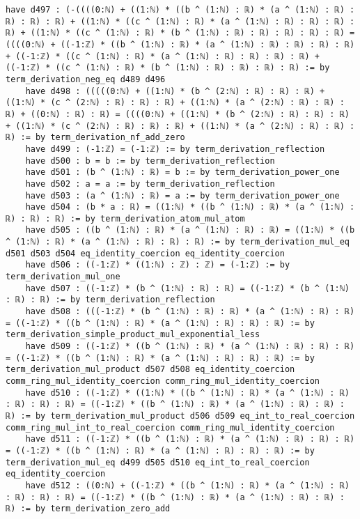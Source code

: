 \documentclass{article}
\begin{document}
\begin{tcolorbox}[colback=white!10, width=\linewidth]
\begin{lstlisting}[language=Lean4]
    have d497 : (-((((0:ℕ) + ((1:ℕ) * ((b ^ (1:ℕ) : ℝ) * (a ^ (1:ℕ) : ℝ) : ℝ) : ℝ) : ℝ) + ((1:ℕ) * ((c ^ (1:ℕ) : ℝ) * (a ^ (1:ℕ) : ℝ) : ℝ) : ℝ) : ℝ) + ((1:ℕ) * ((c ^ (1:ℕ) : ℝ) * (b ^ (1:ℕ) : ℝ) : ℝ) : ℝ) : ℝ) : ℝ) = ((((0:ℕ) + ((-1:ℤ) * ((b ^ (1:ℕ) : ℝ) * (a ^ (1:ℕ) : ℝ) : ℝ) : ℝ) : ℝ) + ((-1:ℤ) * ((c ^ (1:ℕ) : ℝ) * (a ^ (1:ℕ) : ℝ) : ℝ) : ℝ) : ℝ) + ((-1:ℤ) * ((c ^ (1:ℕ) : ℝ) * (b ^ (1:ℕ) : ℝ) : ℝ) : ℝ) : ℝ) := by term_derivation_neg_eq d489 d496
    have d498 : (((((0:ℕ) + ((1:ℕ) * (b ^ (2:ℕ) : ℝ) : ℝ) : ℝ) + ((1:ℕ) * (c ^ (2:ℕ) : ℝ) : ℝ) : ℝ) + ((1:ℕ) * (a ^ (2:ℕ) : ℝ) : ℝ) : ℝ) + ((0:ℕ) : ℝ) : ℝ) = ((((0:ℕ) + ((1:ℕ) * (b ^ (2:ℕ) : ℝ) : ℝ) : ℝ) + ((1:ℕ) * (c ^ (2:ℕ) : ℝ) : ℝ) : ℝ) + ((1:ℕ) * (a ^ (2:ℕ) : ℝ) : ℝ) : ℝ) := by term_derivation_nf_add_zero
    have d499 : (-1:ℤ) = (-1:ℤ) := by term_derivation_reflection
    have d500 : b = b := by term_derivation_reflection
    have d501 : (b ^ (1:ℕ) : ℝ) = b := by term_derivation_power_one
    have d502 : a = a := by term_derivation_reflection
    have d503 : (a ^ (1:ℕ) : ℝ) = a := by term_derivation_power_one
    have d504 : (b * a : ℝ) = ((1:ℕ) * ((b ^ (1:ℕ) : ℝ) * (a ^ (1:ℕ) : ℝ) : ℝ) : ℝ) := by term_derivation_atom_mul_atom
    have d505 : ((b ^ (1:ℕ) : ℝ) * (a ^ (1:ℕ) : ℝ) : ℝ) = ((1:ℕ) * ((b ^ (1:ℕ) : ℝ) * (a ^ (1:ℕ) : ℝ) : ℝ) : ℝ) := by term_derivation_mul_eq d501 d503 d504 eq_identity_coercion eq_identity_coercion
    have d506 : ((-1:ℤ) * ((1:ℕ) : ℤ) : ℤ) = (-1:ℤ) := by term_derivation_mul_one
    have d507 : ((-1:ℤ) * (b ^ (1:ℕ) : ℝ) : ℝ) = ((-1:ℤ) * (b ^ (1:ℕ) : ℝ) : ℝ) := by term_derivation_reflection
    have d508 : (((-1:ℤ) * (b ^ (1:ℕ) : ℝ) : ℝ) * (a ^ (1:ℕ) : ℝ) : ℝ) = ((-1:ℤ) * ((b ^ (1:ℕ) : ℝ) * (a ^ (1:ℕ) : ℝ) : ℝ) : ℝ) := by term_derivation_simple_product_mul_exponential_less
    have d509 : ((-1:ℤ) * ((b ^ (1:ℕ) : ℝ) * (a ^ (1:ℕ) : ℝ) : ℝ) : ℝ) = ((-1:ℤ) * ((b ^ (1:ℕ) : ℝ) * (a ^ (1:ℕ) : ℝ) : ℝ) : ℝ) := by term_derivation_mul_product d507 d508 eq_identity_coercion comm_ring_mul_identity_coercion comm_ring_mul_identity_coercion
    have d510 : ((-1:ℤ) * ((1:ℕ) * ((b ^ (1:ℕ) : ℝ) * (a ^ (1:ℕ) : ℝ) : ℝ) : ℝ) : ℝ) = ((-1:ℤ) * ((b ^ (1:ℕ) : ℝ) * (a ^ (1:ℕ) : ℝ) : ℝ) : ℝ) := by term_derivation_mul_product d506 d509 eq_int_to_real_coercion comm_ring_mul_int_to_real_coercion comm_ring_mul_identity_coercion
    have d511 : ((-1:ℤ) * ((b ^ (1:ℕ) : ℝ) * (a ^ (1:ℕ) : ℝ) : ℝ) : ℝ) = ((-1:ℤ) * ((b ^ (1:ℕ) : ℝ) * (a ^ (1:ℕ) : ℝ) : ℝ) : ℝ) := by term_derivation_mul_eq d499 d505 d510 eq_int_to_real_coercion eq_identity_coercion
    have d512 : ((0:ℕ) + ((-1:ℤ) * ((b ^ (1:ℕ) : ℝ) * (a ^ (1:ℕ) : ℝ) : ℝ) : ℝ) : ℝ) = ((-1:ℤ) * ((b ^ (1:ℕ) : ℝ) * (a ^ (1:ℕ) : ℝ) : ℝ) : ℝ) := by term_derivation_zero_add

\end{lstlisting}
\end{tcolorbox}
\end{document}
